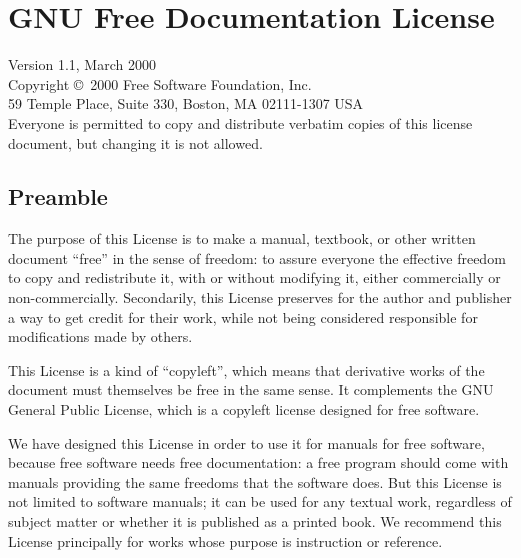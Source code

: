 \chapter{GNU Free Documentation License}
\label{gfdl}



\begingroup
	\small

	Version 1.1, March 2000\\

	Copyright \copyright\ 2000  Free Software Foundation, Inc.\\
		59 Temple Place, Suite 330, Boston, MA  02111-1307  USA\\
	Everyone is permitted to copy and distribute verbatim copies
	of this license document, but changing it is not allowed.

	\section*{Preamble}

	The purpose of this License is to make a manual, textbook, or other
	written document ``free'' in the sense of freedom: to assure everyone
	the effective freedom to copy and redistribute it, with or without
	modifying it, either commercially or non-commercially.  Secondarily,
	this License preserves for the author and publisher a way to get
	credit for their work, while not being considered responsible for
	modifications made by others.

	This License is a kind of ``copyleft'', which means that derivative
	works of the document must themselves be free in the same sense.  It
	complements the GNU General Public License, which is a copyleft
	license designed for free software.

	We have designed this License in order to use it for manuals for free
	software, because free software needs free documentation: a free
	program should come with manuals providing the same freedoms that the
	software does.  But this License is not limited to software manuals;
	it can be used for any textual work, regardless of subject matter or
	whether it is published as a printed book.  We recommend this License
	principally for works whose purpose is instruction or reference.

